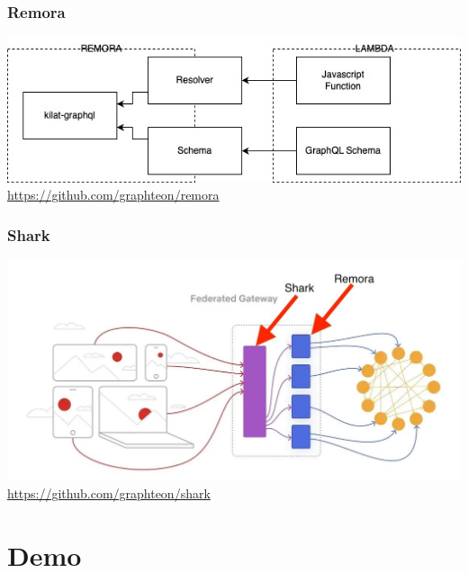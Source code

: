 \documentclass[12pt,xcolor=table]{beamer}
\begin{document}
\begin{frame}
\frametitle{Remora}
\includegraphics[scale=0.5]{images/remora.jpeg}
\url{https://github.com/graphteon/remora}
\end{frame}

\begin{frame}
\frametitle{Shark}
\includegraphics[scale=0.3]{images/shark.jpeg}
\url{https://github.com/graphteon/shark}
\end{frame}

\section{Demo}
\end{document}

